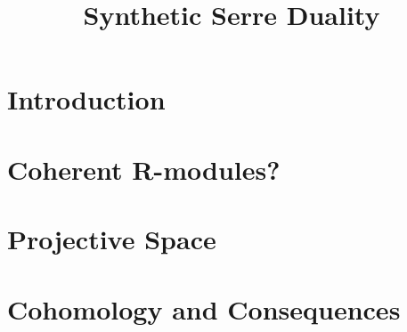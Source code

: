 \documentclass{../util/zariski-small}
\title{Synthetic Serre Duality}
\begin{document}
\author{}

\maketitle


\tableofcontents

\section*{Introduction}


\section{Coherent R-modules?}


\section{Projective Space}


\section{Cohomology and Consequences}


\printbibliography
\end{document}
